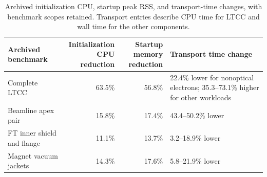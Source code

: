 \begin{table}[htbp]
\centering
\small
\setlength{\tabcolsep}{4pt}
\caption{Archived initialization CPU, startup peak RSS, and transport-time changes, with benchmark scopes
retained. Transport entries describe CPU time for LTCC and wall time for the other components.}
\label{tab:summary-performance}
\begin{tabularx}{\textwidth}{@{}p{3.6cm}rrX@{}}
\toprule
Archived benchmark & \shortstack[r]{Initialization\\CPU reduction} &
\shortstack[r]{Startup memory\\reduction} & Transport time change \\
\midrule
Complete LTCC & 63.5\% & 56.8\% &
22.4\% lower for nonoptical electrons; 35.3--73.1\% higher for other workloads \\
Beamline apex pair & 15.8\% & 17.4\% & 43.4--50.2\% lower \\
FT inner shield and flange & 11.1\% & 13.7\% & 3.2--18.9\% lower \\
Magnet vacuum jackets & 14.3\% & 17.6\% & 5.8--21.9\% lower \\
\bottomrule
\end{tabularx}
\end{table}
\FloatBarrier

